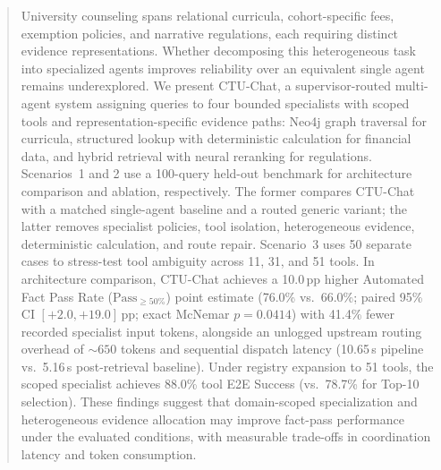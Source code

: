 \begin{abstract}
University counseling spans relational curricula, cohort-specific fees, exemption policies, and narrative regulations, each requiring distinct evidence representations. Whether decomposing this heterogeneous task into specialized agents improves reliability over an equivalent single agent remains underexplored. We present CTU-Chat, a supervisor-routed multi-agent system assigning queries to four bounded specialists with scoped tools and representation-specific evidence paths: Neo4j graph traversal for curricula, structured lookup with deterministic calculation for financial data, and hybrid retrieval with neural reranking for regulations. Scenarios~1 and 2 use a 100-query held-out benchmark for architecture comparison and ablation, respectively. The former compares CTU-Chat with a matched single-agent baseline and a routed generic variant; the latter removes specialist policies, tool isolation, heterogeneous evidence, deterministic calculation, and route repair. Scenario~3 uses 50 separate cases to stress-test tool ambiguity across 11, 31, and 51 tools. In architecture comparison, CTU-Chat achieves a 10.0\,pp higher Automated Fact Pass Rate ($\text{Pass}_{\ge 50\%}$) point estimate (76.0\% vs.\ 66.0\%; paired 95\% CI $[+2.0, +19.0]$\,pp; exact McNemar $p{=}0.0414$) with 41.4\% fewer recorded specialist input tokens, alongside an unlogged upstream routing overhead of ${\sim}650$ tokens and sequential dispatch latency (10.65\,s pipeline vs.\ 5.16\,s post-retrieval baseline). Under registry expansion to 51 tools, the scoped specialist achieves 88.0\% tool E2E Success (vs.\ 78.7\% for Top-10 selection). These findings suggest that domain-scoped specialization and heterogeneous evidence allocation may improve fact-pass performance under the evaluated conditions, with measurable trade-offs in coordination latency and token consumption.

\end{abstract}
